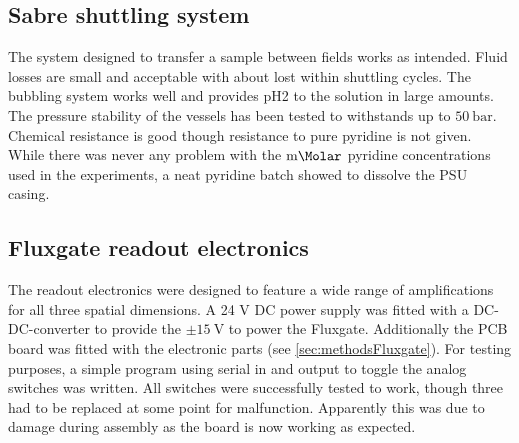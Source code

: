     \subsection{Sabre shuttling system}
        The system designed to transfer a sample between fields works as intended. Fluid losses are
        small and acceptable with about  lost within  shuttling cycles. The
        bubbling system works well and provides pH2 to the solution in large amounts. The pressure
        stability of the vessels has been tested to withstands up to $\SI{50}{\bar}$. Chemical
        resistance is good though resistance to pure pyridine is not given. While there was never
        any problem with the $\SI{}{\milli\Molar}$ pyridine concentrations used in the experiments, a
        neat pyridine batch showed to dissolve the PSU casing.
    \subsection{Fluxgate readout electronics}
        The readout electronics were designed to feature a wide range of amplifications for all
        three spatial dimensions. A 24 V DC power supply was fitted with a DC-DC-converter to
        provide the $\pm\SI{15}{\volt}$ to power the Fluxgate. Additionally the PCB board was fitted
        with the electronic parts (see \ref{sec:methodsFluxgate}). For testing purposes, a simple program
        using serial in and output to toggle the analog switches was written. All switches were
        successfully tested to work, though three had to be replaced at some point for malfunction.
        Apparently this was due to damage during assembly as the board is now working as expected.
